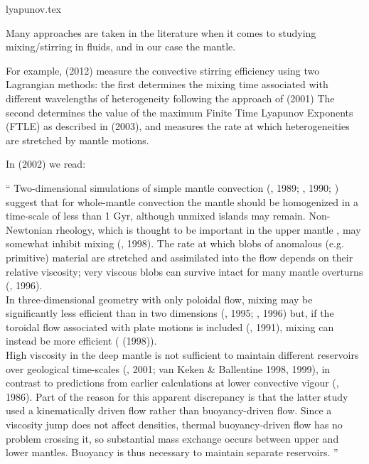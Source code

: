 \begin{flushright} {\tiny {\color{gray} lyapunov.tex}} \end{flushright}

Many approaches are taken in the literature when it comes 
to studying mixing/stirring in fluids, and in our case the mantle.

For example, \textcite{sato12} (2012) 
measure the convective stirring efficiency using two Lagrangian methods: 
the first determines the mixing time associated with
different wavelengths of heterogeneity following the approach of \textcite{feri01} (2001)
The second determines the value of
the maximum Finite Time Lyapunov Exponents (FTLE) as described in 
\textcite{fasa03} (2003), and measures the rate at
which heterogeneities are stretched by mantle motions.

In \textcite{taxi02} (2002) we read: 

\begin{displayquote}
{\color{darkgray}
``
Two-dimensional simulations of simple mantle convection (\textcite{chri89}, 1989; 
\textcite{ketu90}, 1990; \textcite{scha94}) suggest that for whole-mantle 
convection the mantle should be homogenized in a time-scale of less than 1 Gyr, although
unmixed islands may remain. Non-Newtonian rheology, which is thought to be 
important in the upper mantle \cite{kawu93}, may somewhat inhibit mixing (\textcite{tepy98}, 1998). 
The rate at which blobs of anomalous (e.g. primitive) material are stretched
and assimilated into the ﬂow depends on their relative viscosity; very viscous blobs
can survive intact for many mantle overturns (\textcite{mang96}, 1996).
\\
In three-dimensional geometry with only poloidal ﬂow, mixing may be signiﬁcantly
less efficient than in two dimensions (\textcite{schh95}, 1995; \textcite{schh96}, 1996) 
but, if the toroidal ﬂow associated with plate motions is 
included (\textcite{gaot91}, 1991), mixing can instead be more efficient 
(\textcite{feri98} (1998)).
\\
High viscosity in the deep mantle is not suﬃcient to maintain diﬀerent reservoirs
over geological time-scales (\textcite{feri01}, 2001; van Keken \& Ballentine 1998,
1999), in contrast to predictions from earlier calculations at lower convective vigour
(\textcite{guda86b}, 1986). Part of the reason for this apparent discrepancy is that
the latter study used a kinematically driven ﬂow rather than buoyancy-driven ﬂow.
Since a viscosity jump does not affect densities, thermal buoyancy-driven ﬂow has no
problem crossing it, so substantial mass exchange occurs between upper and lower
mantles. Buoyancy is thus necessary to maintain separate reservoirs.
''
}
\end{displayquote}


